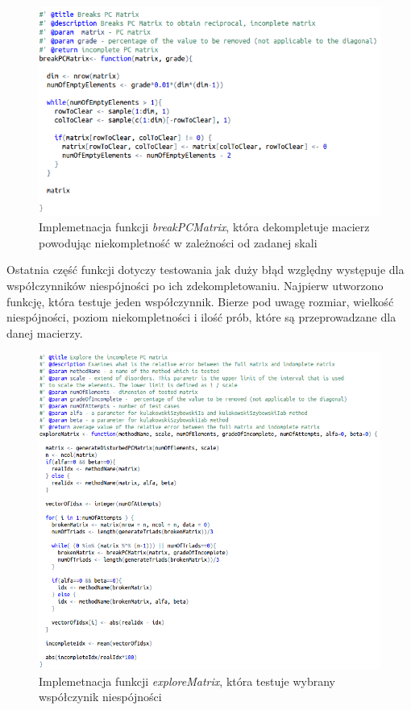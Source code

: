 \begin{figure}[!ht]
\centerline{\includegraphics[scale=0.73]{images/kod13.png}}
\caption{Implemetnacja funkcji \textit{breakPCMatrix}, która dekompletuje macierz powodując niekompletność w zależności od zadanej skali}
\label{fig:rstudio}
\end{figure}

Ostatnia część funkcji dotyczy testowania jak duży błąd względny występuje dla współczynników niespójności po ich zdekompletowaniu. Najpierw utworzono funkcję, która testuje jeden współczynnik. Bierze pod uwagę rozmiar, wielkość niespójności, poziom niekompletności i ilość prób, które są przeprowadzane dla danej macierzy.

\begin{figure}[!ht]
\centerline{\includegraphics[scale=0.58]{images/kod21.png}}
\caption{Implemetnacja funkcji \textit{exploreMatrix}, która testuje wybrany współczynik niespójności}
\label{fig:rstudio}
\end{figure}

